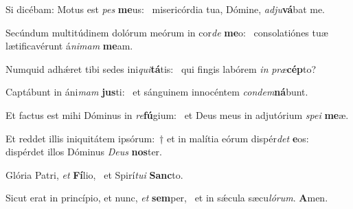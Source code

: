 \item Si dicébam: Motus est \textit{pes} \textbf{me}us:~\psstar{} misericórdia tua, Dómine, \textit{adju}\textbf{vá}bat me.
\item Secúndum multitúdinem dolórum meórum in cor\textit{de} \textbf{me}o:~\psstar{} consolatiónes tuæ lætificavérunt á\textit{nimam} \textbf{me}am.
\item Numquid adhǽret tibi sedes ini\textit{qui}\textbf{tá}tis:~\psstar{} qui fingis labórem \textit{in} \textit{præ}\textbf{cép}to?
\item Captábunt in áni\textit{mam} \textbf{jus}ti:~\psstar{} et sánguinem innocéntem \textit{condem}\textbf{ná}bunt.
\item Et factus est mihi Dóminus in \textit{re}\textbf{fú}gium:~\psstar{} et Deus meus in adjutórium \textit{spei} \textbf{me}æ.
\item Et reddet illis iniquitátem ipsórum:~† et in malítia eórum dispér\textit{det} \textbf{e}os:~\psstar{} dispérdet illos Dóminus \textit{Deus} \textbf{nos}ter.
\item Glória Patri, \textit{et} \textbf{Fí}lio,~\psstar{} et Spirí\textit{tui} \textbf{Sanc}to.
\item Sicut erat in princípio, et nunc, \textit{et} \textbf{sem}per,~\psstar{} et in sǽcula sæcu\textit{lórum}. \textbf{A}men.
